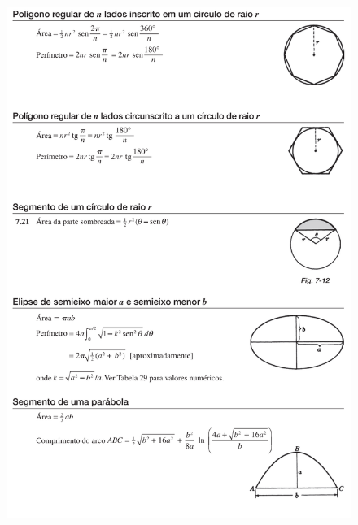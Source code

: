 \begin{figure}[H]
    \centering
    \includegraphics[width=\textwidth]{matematica/geometria/formulas3}
\end{figure}

